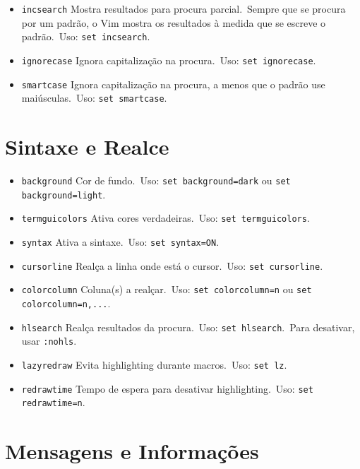 \begin{itemize}
    \setlength{\itemsep}{-5pt} %
    \item \texttt{incsearch} Mostra resultados para procura parcial.\ Sempre que se procura por um padrão, o Vim mostra os resultados à medida que se escreve o padrão.\ Uso: \texttt{set incsearch}.
    \item \texttt{ignorecase} Ignora capitalização na procura.\ Uso: \texttt{set ignorecase}.
    \item \texttt{smartcase} Ignora capitalização na procura, a menos que o padrão use maiúsculas.\ Uso: \texttt{set smartcase}.
\end{itemize}

\section{Sintaxe e Realce}

\begin{itemize}
    \setlength{\itemsep}{-5pt} %
    \item \texttt{background} Cor de fundo.\ Uso: \texttt{set background=dark} ou \texttt{set background=light}.
    \item \texttt{termguicolors} Ativa cores verdadeiras.\ Uso: \texttt{set termguicolors}.
    \item \texttt{syntax} Ativa a sintaxe.\ Uso: \texttt{set syntax=ON}.
    \item \texttt{cursorline} Realça a linha onde está o cursor.\ Uso: \texttt{set cursorline}.
    \item \texttt{colorcolumn} Coluna(s) a realçar.\ Uso: \texttt{set colorcolumn=n} ou \texttt{set colorcolumn=n,...}.
    \item \texttt{hlsearch} Realça resultados da procura.\ Uso: \texttt{set hlsearch}.\ Para desativar, usar \texttt{:nohls}.
    \item \texttt{lazyredraw} Evita highlighting durante macros.\ Uso: \texttt{set lz}.
    \item \texttt{redrawtime} Tempo de espera para desativar highlighting.\ Uso: \texttt{set redrawtime=n}.
\end{itemize}

\section{Mensagens e Informações}

